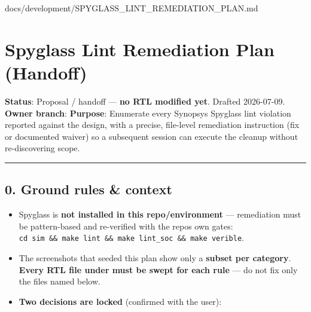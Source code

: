 \begin{relocated}{docs/development/SPYGLASS_LINT_REMEDIATION_PLAN.md}
\section{Spyglass Lint Remediation Plan (Handoff)}\label{um:guide:spyglass-lint-remediation}

\textbf{Status}: Proposal / handoff --- \textbf{no RTL modified yet}.
Drafted 2026-07-09. \textbf{Owner branch}:
 \textbf{Purpose}:
Enumerate every Synopsys Spyglass lint violation reported against the
 design, with a precise, file-level remediation
instruction (fix or documented waiver) so a subsequent session can
execute the cleanup without re-discovering scope.

\begin{center}\rule{0.5\linewidth}{0.5pt}\end{center}

\subsection{0. Ground rules \& context}\label{um:guide:spyglass-lint-remediation:0-ground-rules-context}

\begin{itemize}
\tightlist
\item
  Spyglass is \textbf{not installed in this
  repo/\allowbreak{}environment} --- remediation must be pattern-based
  and re-verified with the repo\textquotesingle s own gates:
  \texttt{cd\ sim\ \&\&\ make\ lint\ \&\&\ make\ lint\_\allowbreak{}soc\ \&\&\ make\ verible}.
\item
  The screenshots that seeded this plan show only a \textbf{subset per
  category}. \textbf{Every RTL file under  must be swept for
  each rule} --- do not fix only the files named below.
\item
  \textbf{Two decisions are locked} (confirmed with the user):


\end{itemize}
\end{relocated}
